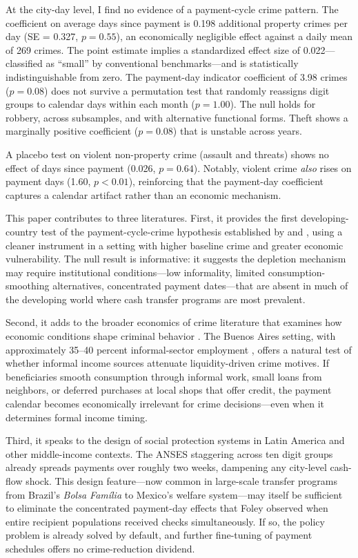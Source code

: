 \documentclass[12pt]{article}
\begin{document}
At the city-day level, I find no evidence of a payment-cycle crime pattern. The coefficient on average days since payment is 0.198 additional property crimes per day (SE = 0.327, $p = 0.55$), an economically negligible effect against a daily mean of 269 crimes. The point estimate implies a standardized effect size of 0.022---classified as ``small'' by conventional benchmarks---and is statistically indistinguishable from zero. The payment-day indicator coefficient of 3.98 crimes ($p = 0.08$) does not survive a permutation test that randomly reassigns digit groups to calendar days within each month ($p = 1.00$). The null holds for robbery, across subsamples, and with alternative functional forms. Theft shows a marginally positive coefficient ($p = 0.08$) that is unstable across years.

A placebo test on violent non-property crime (assault and threats) shows no effect of days since payment (0.026, $p = 0.64$). Notably, violent crime \textit{also} rises on payment days (1.60, $p < 0.01$), reinforcing that the payment-day coefficient captures a calendar artifact rather than an economic mechanism.

This paper contributes to three literatures. First, it provides the first developing-country test of the payment-cycle-crime hypothesis established by \citet{foley2011} and \citet{stam2024}, using a cleaner instrument in a setting with higher baseline crime and greater economic vulnerability. The null result is informative: it suggests the depletion mechanism may require institutional conditions---low informality, limited consumption-smoothing alternatives, concentrated payment dates---that are absent in much of the developing world where cash transfer programs are most prevalent.

Second, it adds to the broader economics of crime literature that examines how economic conditions shape criminal behavior \citep{raphael2001, machin2011, dix2017, yang2017}. The Buenos Aires setting, with approximately 35--40 percent informal-sector employment \citep{gasparini2009}, offers a natural test of whether informal income sources attenuate liquidity-driven crime motives. If beneficiaries smooth consumption through informal work, small loans from neighbors, or deferred purchases at local shops that offer credit, the payment calendar becomes economically irrelevant for crime decisions---even when it determines formal income timing.

Third, it speaks to the design of social protection systems in Latin America and other middle-income contexts. The ANSES staggering across ten digit groups already spreads payments over roughly two weeks, dampening any city-level cash-flow shock. This design feature---now common in large-scale transfer programs from Brazil's \textit{Bolsa Fam\'ilia} to Mexico's welfare system---may itself be sufficient to eliminate the concentrated payment-day effects that Foley observed when entire recipient populations received checks simultaneously. If so, the policy problem is already solved by default, and further fine-tuning of payment schedules offers no crime-reduction dividend.
\end{document}
